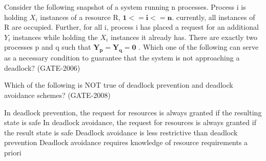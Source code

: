\vspace{0.08in}


\begin{minipage}{\linewidth}

  \question  Consider the following snapshot of a system running n processes. Process i is holding \(X_i\) instances of a resource R, \( \mathbf{ 1 <= i <= n } \). currently, all instances of R are occupied. Further, for all i, process i has placed a request for an additional \(Y_i\) instances while holding the \(X_i\) instances it already has. There are exactly two processes p and q such that \( \mathbf{ Y_p = Y_q = 0 } \) . Which one of the following can serve as a necessary condition to guarantee that the system is not approaching a deadlock? (GATE-2006)

  \begin{choices}
  \end{choices}

  \end{minipage}

\vspace{0.08in}


\begin{minipage}{\linewidth}

  \question  Which of the following is NOT true of deadlock prevention and deadlock avoidance schemes? (GATE-2008)

  \begin{choices}
    \choice  In deadlock prevention, the request for resources is always granted if the resulting state is safe
    \choice  In deadlock avoidance, the request for resources is always granted if the result state is safe
    \choice  Deadlock avoidance is less restrictive than deadlock prevention
    \choice  Deadlock avoidance requires knowledge of resource requirements a priori
  \end{choices}

  \end{minipage}

\vspace{0.08in}


